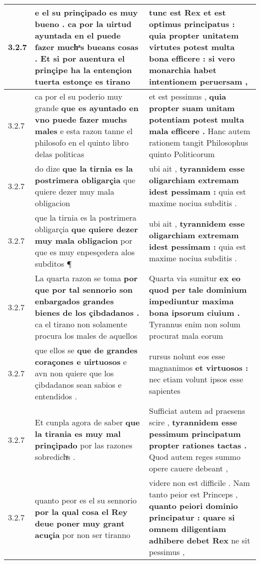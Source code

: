 \begin{tabular}{|p{1cm}|p{6.5cm}|p{6.5cm}|}
3.2.7 & e el su prinçipado es muy bueno . \textbf{ ca por la uirtud ayuntada en el puede fazer muchͣs bueans cosas . } Et si por auentura el prinçipe ha la entençion tuerta estonçe es tirano & tunc est Rex et est optimus principatus : \textbf{ quia propter unitatem virtutes potest multa bona efficere : } si vero monarchia habet intentionem peruersam , \\\hline
3.2.7 & ca por el su poderio muy grande \textbf{ que es ayuntado en vno puede fazer muchs males } e esta razon tanne el philosofo en el quinto libro delas politicas & et est pessimus , \textbf{ quia propter suam unitam potentiam potest multa mala efficere . } Hanc autem rationem tangit Philosophus quinto Politicorum \\\hline
3.2.7 & do dize \textbf{ que la tirnia es la postrimera obligarçia } que quiere dezer muy mala obligacion & ubi ait , \textbf{ tyrannidem esse oligarchiam extremam idest pessimam : } quia est maxime nociua subditis . \\\hline
3.2.7 & que la tirnia es la postrimera obligarçia \textbf{ que quiere dezer muy mala obligacion } por que es muy enpesçedera alos subditos ¶ & ubi ait , \textbf{ tyrannidem esse oligarchiam extremam idest pessimam : } quia est maxime nociua subditis . \\\hline
3.2.7 & La quarta razon se toma \textbf{ por que por tal sennorio son enbargados grandes bienes de los çibdadanos . } ca el tirano non solamente procura los males de aquellos & Quarta via sumitur \textbf{ ex eo quod per tale dominium impediuntur maxima bona ipsorum ciuium . } Tyrannus enim non solum procurat mala eorum \\\hline
3.2.7 & que ellos se \textbf{ que de grandes coraçones e uirtuosos } e avn non quiere que los çibdadanos sean sabios e entendidos . & rursus nolunt eos esse magnanimos \textbf{ et virtuosos : } nec etiam volunt ipsos esse sapientes \\\hline
3.2.7 & Et cunpla agora de saber \textbf{ que la tirania es muy mal prinçipado } por las razones sobredichͣs . & Sufficiat autem ad praesens scire , \textbf{ tyrannidem esse pessimum principatum propter rationes tactas . } Quod autem reges summo opere cauere debeant , \\\hline
3.2.7 & quanto peor es el su sennorio \textbf{ por la qual cosa el Rey deue poner muy grant acuçia } por non ser tiranno & videre non est difficile . Nam tanto peior est Princeps , \textbf{ quanto peiori dominio principatur : quare si omnem diligentiam adhibere debet Rex } ne sit pessimus , \\\hline

\end{tabular}
